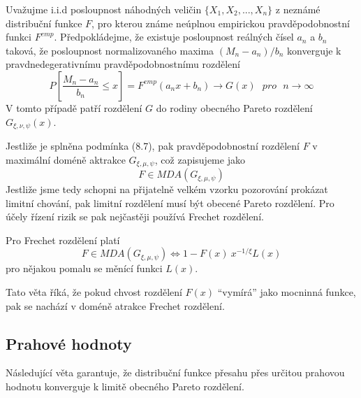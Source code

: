 \begin{theorem}
Uvažujme i.i.d posloupnost náhodných veličin $\{X_1, X_2, ..., X_n\}$ z neznámé distribuční funkce $F$, pro kterou známe neúplnou empirickou pravděpodobnostní funkci $F^{emp}$. Předpokládejme, že existuje posloupnost reálných čísel $a_n$ a $b_n$ taková, že posloupnost normalizovaného maxima $(M_n - a_n) / b_n$ konverguje k pravdnedegerativnímu pravděpodobnostnímu rozdělení
\begin{equation}
P\left[\frac{M_n - a_n}{b_n} \le x \right] = F^{emp}(a_nx + b_n) \rightarrow G(x) ~~~ pro ~~~ n \rightarrow \infty
\end{equation}
V tomto případě patří rozdělení $G$ do rodiny obecného Pareto rozdělení $G_{\xi, \nu, \psi}(x)$. 
\end{theorem}
Jestliže je splněna podmínka (8.7), pak pravděpodobnostní rozdělení $F$ v maximální doméně aktrakce $G_{\xi, \mu, \psi}$, což zapisujeme jako
\begin{equation}
F \in MDA(G_{\xi, \mu, \psi})
\end{equation}
Jestliže jsme tedy schopni na přijatelně velkém vzorku pozorování prokázat limitní chování, pak limitní rozdělení musí být obecené Pareto rozdělení. Pro účely řízení rizik se pak nejčastěji používá Frechet rozdělení.
\begin{theorem}[Gnedenko, 1943]
Pro Frechet rozdělení platí
\begin{equation}
F \in MDA(G_{\xi, \mu, \psi}) \Leftrightarrow 1 - F(x) ~ x^{-1/\xi}L(x)
\end{equation}
pro nějakou pomalu se měnící funkci $L(x)$.
\end{theorem}
Tato věta říká, že pokud chvost rozdělení $F(x)$ ``vymírá'' jako mocninná funkce, pak se nachází v doméně atrakce Frechet rozdělení.

\subsection{Prahové hodnoty}

Následující věta garantuje, že distribuční funkce přesahu přes určitou prahovou hodnotu konverguje k limitě obecného Pareto rozdělení.


